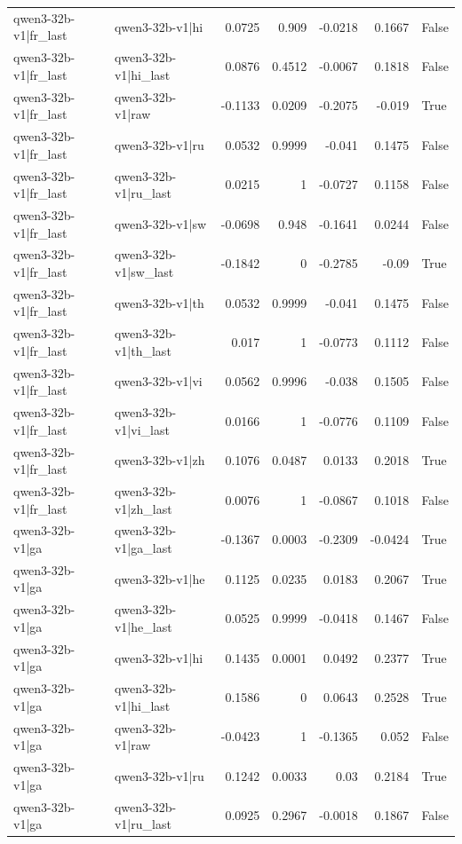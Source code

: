 \begin{table}
\begin{tabular}{l l r r r r l}
qwen3-32b-v1|fr_last & qwen3-32b-v1|hi & 0.0725 & 0.909 & -0.0218 & 0.1667 & False \\
qwen3-32b-v1|fr_last & qwen3-32b-v1|hi_last & 0.0876 & 0.4512 & -0.0067 & 0.1818 & False \\
qwen3-32b-v1|fr_last & qwen3-32b-v1|raw & -0.1133 & 0.0209 & -0.2075 & -0.019 & True \\
qwen3-32b-v1|fr_last & qwen3-32b-v1|ru & 0.0532 & 0.9999 & -0.041 & 0.1475 & False \\
qwen3-32b-v1|fr_last & qwen3-32b-v1|ru_last & 0.0215 & 1 & -0.0727 & 0.1158 & False \\
qwen3-32b-v1|fr_last & qwen3-32b-v1|sw & -0.0698 & 0.948 & -0.1641 & 0.0244 & False \\
qwen3-32b-v1|fr_last & qwen3-32b-v1|sw_last & -0.1842 & 0 & -0.2785 & -0.09 & True \\
qwen3-32b-v1|fr_last & qwen3-32b-v1|th & 0.0532 & 0.9999 & -0.041 & 0.1475 & False \\
qwen3-32b-v1|fr_last & qwen3-32b-v1|th_last & 0.017 & 1 & -0.0773 & 0.1112 & False \\
qwen3-32b-v1|fr_last & qwen3-32b-v1|vi & 0.0562 & 0.9996 & -0.038 & 0.1505 & False \\
qwen3-32b-v1|fr_last & qwen3-32b-v1|vi_last & 0.0166 & 1 & -0.0776 & 0.1109 & False \\
qwen3-32b-v1|fr_last & qwen3-32b-v1|zh & 0.1076 & 0.0487 & 0.0133 & 0.2018 & True \\
qwen3-32b-v1|fr_last & qwen3-32b-v1|zh_last & 0.0076 & 1 & -0.0867 & 0.1018 & False \\
qwen3-32b-v1|ga & qwen3-32b-v1|ga_last & -0.1367 & 0.0003 & -0.2309 & -0.0424 & True \\
qwen3-32b-v1|ga & qwen3-32b-v1|he & 0.1125 & 0.0235 & 0.0183 & 0.2067 & True \\
qwen3-32b-v1|ga & qwen3-32b-v1|he_last & 0.0525 & 0.9999 & -0.0418 & 0.1467 & False \\
qwen3-32b-v1|ga & qwen3-32b-v1|hi & 0.1435 & 0.0001 & 0.0492 & 0.2377 & True \\
qwen3-32b-v1|ga & qwen3-32b-v1|hi_last & 0.1586 & 0 & 0.0643 & 0.2528 & True \\
qwen3-32b-v1|ga & qwen3-32b-v1|raw & -0.0423 & 1 & -0.1365 & 0.052 & False \\
qwen3-32b-v1|ga & qwen3-32b-v1|ru & 0.1242 & 0.0033 & 0.03 & 0.2184 & True \\
qwen3-32b-v1|ga & qwen3-32b-v1|ru_last & 0.0925 & 0.2967 & -0.0018 & 0.1867 & False \\

\end{tabular}
\end{table}
